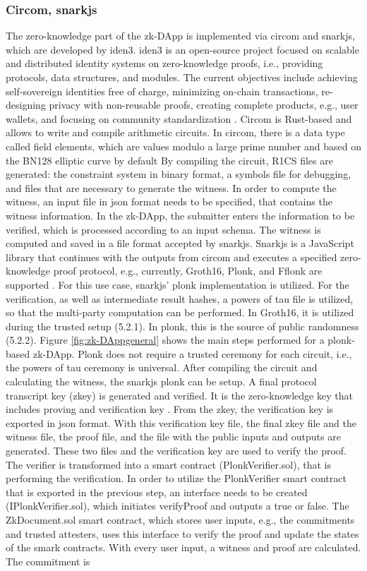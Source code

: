 \subsubsection{Circom, snarkjs}
The zero-knowledge part of the zk-DApp is implemented via circom and snarkjs, which are developed by iden3. iden3 is an open-source project focused on scalable and distributed identity systems on zero-knowledge proofs, i.e., providing protocols, data structures, and modules. The current objectives include achieving self-sovereign identities free of charge, minimizing on-chain transactions, re-designing privacy with non-reusable proofs, creating complete products, e.g., user wallets, and focusing on community standardization \citep{iden3aboutus}. Circom is Rust-based and allows to write and compile arithmetic circuits. In circom, there is a data type called field elements, which are values modulo a large prime number and based on the BN128 elliptic curve by default \citep{circom} By compiling the circuit, R1CS files are generated: the constraint system in binary format, a symbols file for debugging, and files that are necessary to generate the witness. In order to compute the witness, an input file in json format needs to be specified, that contains the witness information. In the zk-DApp, the submitter enters the information to be verified, which is processed according to an input schema. The witness is computed and saved in a file format accepted by snarkjs. Snarkjs is a JavaScript library that continues with the outputs from circom and executes a specified zero-knowledge proof protocol, e.g., currently, Groth16, Plonk, and Fflonk are supported \citep{snarkjsdoc}. For this use case, snarkjs' plonk implementation is utilized. For the verification, as well as intermediate result hashes, a powers of tau file is utilized, so that the multi-party computation can be performed. In Groth16, it is utilized during the trusted setup (5.2.1). In plonk, this is the source of public randomness (5.2.2). Figure \ref{fig:zk-DAppgeneral} shows the main steps performed for a plonk-based zk-DApp. Plonk does not require a trusted ceremony for each circuit, i.e., the powers of tau ceremony is universal. After compiling the circuit and calculating the witness, the snarkjs plonk can be setup. A final protocol transcript key (zkey) is generated and verified. It is the zero-knowledge key that includes proving and verification key \citep{snarkjsdoc}. From the zkey, the verification key is exported in json format. With this verification key file, the final zkey file and the witness file, the proof file, and the file with the public inputs and outputs are generated. These two files and the verification key are used to verify the proof. The verifier is transformed into a smart contract (PlonkVerifier.sol), that is performing the verification. In order to utilize the PlonkVerifier smart contract that is exported in the previous step, an interface needs to be created (IPlonkVerifier.sol), which initiates verifyProof and outputs a true or false. The ZkDocument.sol smart contract, which stores user inputs, e.g., the commitments and trusted attesters, uses this interface to verify the proof and update the states of the smark contracts. With every user input, a witness and proof are calculated. The commitment is 